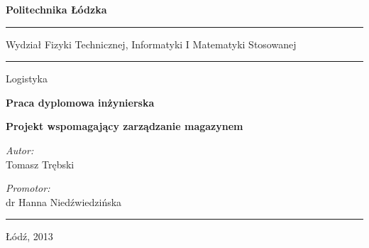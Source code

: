 \thispagestyle{empty}

\begin{center}
\huge \bf
Politechnika Łódzka
\vskip -20pt
\rule{\textwidth}{.1mm}
\vskip 10pt
\large
Wydział Fizyki Technicznej, Informatyki I Matematyki Stosowanej
\rule{\textwidth}{.1mm}
\vskip 10pt
Logistyka
\end{center}

\vskip 58pt

\vskip 18pt

\begin{center}
{\bf \large Praca dyplomowa inżynierska}
\end {center}

\vskip 18pt

\begin{adjustwidth}{20pt}{20pt}
\begin{center}
{\bf \normalsize Projekt wspomagający zarządzanie magazynem}
\end{center}
\end{adjustwidth}

\vskip 40pt
\begin{flushleft}
{\emph{Autor:} \\ Tomasz Trębski}
\end{flushleft}


\begin{flushright}
\vskip -40pt
{\emph{Promotor:} \\ dr Hanna Niedźwiedzińska }
\end{flushright}

\vfill
\noindent
\rule{\textwidth}{.1mm}
\begin{center}
Łódź, 2013
\end{center}